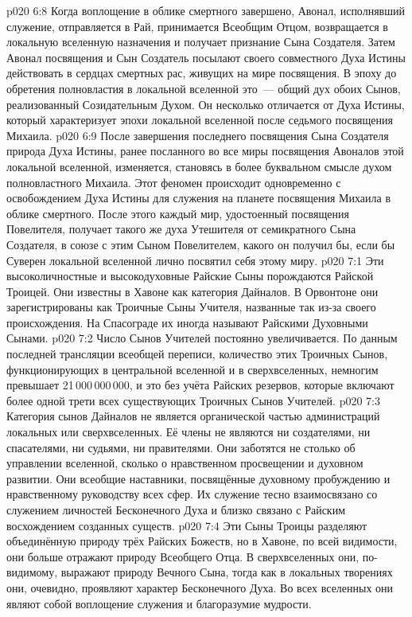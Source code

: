 \vs p020 6:8 Когда воплощение в облике смертного завершено, Авонал, исполнявший служение, отправляется в Рай, принимается Всеобщим Отцом, возвращается в локальную вселенную назначения и получает признание Сына Создателя. Затем Авонал посвящения и Сын Создатель посылают своего совместного Духа Истины действовать в сердцах смертных рас, живущих на мире посвящения. В эпоху до обретения полновластия в локальной вселенной это~--- общий дух обоих Сынов, реализованный Созидательным Духом. Он несколько отличается от Духа Истины, который характеризует эпохи локальной вселенной после седьмого посвящения Михаила.
\vs p020 6:9 После завершения последнего посвящения Сына Создателя природа Духа Истины, ранее посланного во все миры посвящения Авоналов этой локальной вселенной, изменяется, становясь в более буквальном смысле духом полновластного Михаила. Этот феномен происходит одновременно с освобождением Духа Истины для служения на планете посвящения Михаила в облике смертного. После этого каждый мир, удостоенный посвящения Повелителя, получает такого же духа Утешителя от семикратного Сына Создателя, в союзе с этим Сыном Повелителем, какого он получил бы, если бы Суверен локальной вселенной лично посвятил себя этому миру.
\vs p020 7:1 Эти высоколичностные и высокодуховные Райские Сыны порождаются Райской Троицей. Они известны в Хавоне как категория Дайналов. В Орвонтоне они зарегистрированы как Троичные Сыны Учителя, названные так из-за своего происхождения. На Спасограде их иногда называют Райскими Духовными Сынами.
\vs p020 7:2 Число Сынов Учителей постоянно увеличивается. По данным последней трансляции всеобщей переписи, количество этих Троичных Сынов, функционирующих в центральной вселенной и в сверхвселенных, немногим превышает 21\,000\,000\,000, и это без учёта Райских резервов, которые включают более одной трети всех существующих Троичных Сынов Учителей.
\vs p020 7:3 Категория сынов Дайналов не является органической частью администраций локальных или сверхвселенных. Её члены не являются ни создателями, ни спасателями, ни судьями, ни правителями. Они заботятся не столько об управлении вселенной, сколько о нравственном просвещении и духовном развитии. Они всеобщие наставники, посвящённые духовному пробуждению и нравственному руководству всех сфер. Их служение тесно взаимосвязано со служением личностей Бесконечного Духа и близко связано с Райским восхождением созданных существ.
\vs p020 7:4 Эти Сыны Троицы разделяют объединённую природу трёх Райских Божеств, но в Хавоне, по всей видимости, они больше отражают природу Всеобщего Отца. В сверхвселенных они, по\hyp{}видимому, выражают природу Вечного Сына, тогда как в локальных творениях они, очевидно, проявляют характер Бесконечного Духа. Во всех вселенных они являют собой воплощение служения и благоразумие мудрости.
